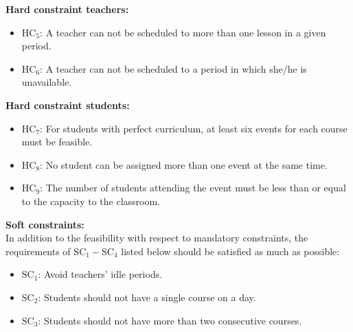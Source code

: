 \documentclass[centering]{report}
\newenvironment{slide}
    {\newpage
    \vspace*{\fill}
    }
    { 
     \vspace*{\fill}
    }
\begin{document}
\begin{slide}
\textbf{Hard constraint teachers:}\\

\begin{itemize}
\item $\mathrm{HC_{5}}$: {\color{gray}A teacher can not be scheduled to more than one lesson in a given period.}
\item $\mathrm{HC_{6}}$: {\color{gray}A teacher can not be scheduled to a period in which she/he is unavailable.}
\end{itemize}

\end{slide}

\begin{slide}
\textbf{Hard constraint students:}\\

\begin{itemize}
\item $\mathrm{HC_{7}}$: {For students with perfect curriculum, at least six events for each course must be feasible.}
\item $\mathrm{HC_{8}}$: {\color{gray}No student can be assigned more than one event at the same time.}
\item $\mathrm{HC_{9}}$: {\color{gray}The number of students attending the event must be less than or equal to the capacity to the classroom.}
\end{itemize}
\end{slide}

\begin{slide}
\textbf{Soft constraints:}\\

In addition to the feasibility with respect to mandatory constraints, the requirements of $ \mathrm {SC_{1}-SC_{4}} $ listed below should be satisfied as much as possible:

\begin{itemize}
\item $\mathrm{SC_{1}}$: {\color{gray}Avoid teachers' idle periods.}
\item $\mathrm{SC_{2}}$: {\color{gray}Students should not have a single course on a day.}
\item $\mathrm{SC_{3}}$: {\color{gray}Students should not have more than two consecutive courses.}
\end{itemize}

\end{slide}
\end{document}

